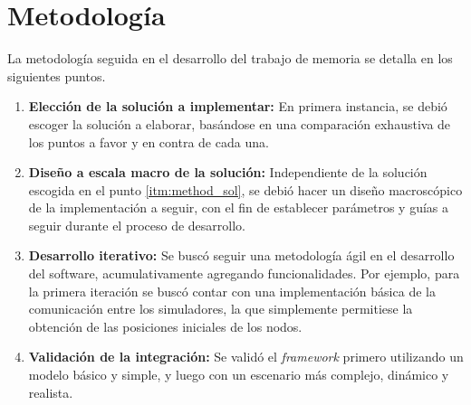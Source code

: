 \section{Metodología}

La metodología seguida en el desarrollo del trabajo de memoria se detalla en los siguientes puntos.

\begin{enumerate}
    \item \label{itm:method_sol} \textbf{Elección de la solución a implementar:} En primera instancia, se debió escoger la solución a elaborar, basándose en una comparación exhaustiva de los puntos a favor y en contra de cada una. 
    
    \item \textbf{Diseño a escala macro de la solución:} Independiente de la solución escogida en el punto \ref{itm:method_sol}, se debió hacer un diseño macroscópico de la implementación a seguir, con el fin de establecer parámetros y guías a seguir durante el proceso de desarrollo. 
    
    \item \textbf{Desarrollo iterativo:} Se buscó seguir una metodología ágil en el desarrollo del software, acumulativamente agregando funcionalidades. Por ejemplo, para la primera iteración se buscó contar con una implementación básica de la comunicación entre los simuladores, la que simplemente permitiese la obtención de las posiciones iniciales de los nodos.
    
    \item \textbf{Validación de la integración:} Se validó el \textit{framework} primero utilizando un modelo básico y simple, y luego con un escenario más complejo, dinámico y realista. 
\end{enumerate}
